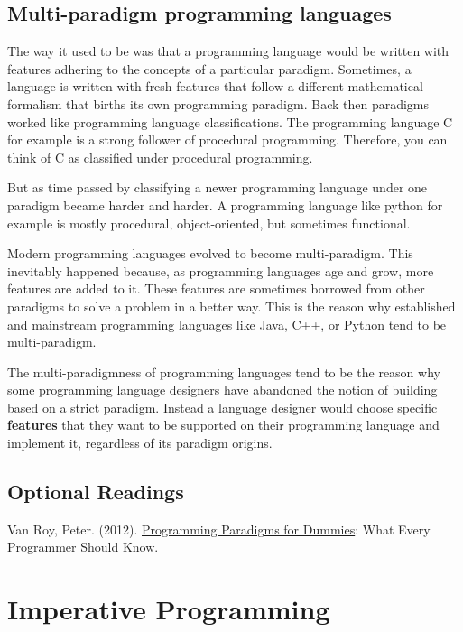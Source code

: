 \section{Multi-paradigm programming
languages}\label{programming-paradigms-introduction.md__multi-paradigm-programming-languages}

The way it used to be was that a programming language would be written
with features adhering to the concepts of a particular paradigm.
Sometimes, a language is written with fresh features that follow a
different mathematical formalism that births its own programming
paradigm. Back then paradigms worked like programming language
classifications. The programming language C for example is a strong
follower of procedural programming. Therefore, you can think of C as
classified under procedural programming.

But as time passed by classifying a newer programming language under one
paradigm became harder and harder. A programming language like python
for example is mostly procedural, object-oriented, but sometimes
functional.

Modern programming languages evolved to become multi-paradigm. This
inevitably happened because, as programming languages age and grow, more
features are added to it. These features are sometimes borrowed from
other paradigms to solve a problem in a better way. This is the reason
why established and mainstream programming languages like Java, C++, or
Python tend to be multi-paradigm.

The multi-paradigmness of programming languages tend to be the reason
why some programming language designers have abandoned the notion of
building based on a strict paradigm. Instead a language designer would
choose specific \textbf{features} that they want to be supported on
their programming language and implement it, regardless of its paradigm
origins.

\section{Optional
Readings}\label{programming-paradigms-introduction.md__optional-readings}

Van Roy, Peter. (2012).
\href{https://www.researchgate.net/publication/241111987_Programming_Paradigms_for_Dummies_What_Every_Programmer_Should_Know}{Programming
Paradigms for Dummies}: What Every Programmer Should Know.

\chapter{Imperative
Programming}\label{imperative-programming.md__imperative-programming}

